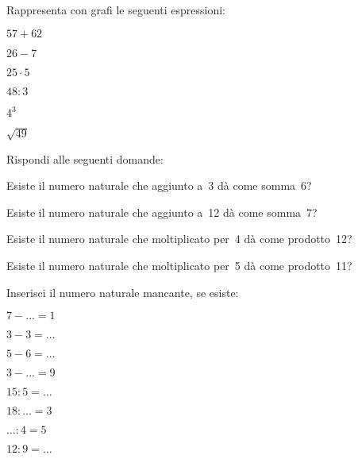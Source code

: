 \begin{esercizio}
Rappresenta con grafi le seguenti espressioni:
\begin{htmulticols}{3}
 \begin{enumeratees}
 \item \(57 + 62\) \qquad
 \item \(26 - 7\) \qquad
 \item \(25 \cdot 5\) \qquad
 \item \(48 : 3\) \qquad
 \item \(4^3\) \qquad
 \item \(\sqrt{49}\) \qquad
 \end{enumeratees}
\end{htmulticols}
\end{esercizio}

\begin{esercizio}
Rispondi alle seguenti domande:
 \begin{enumeratees}
 \item Esiste il numero naturale che aggiunto a~3 dà come somma~6?
 \item Esiste il numero naturale che aggiunto a~12 dà come somma~7?
 \item Esiste il numero naturale che moltiplicato per~4 dà come prodotto~12?
 \item Esiste il numero naturale che moltiplicato per~5 dà come prodotto~11?
 \end{enumeratees}
\end{esercizio}

\begin{esercizio}
 Inserisci il numero naturale mancante, se esiste:
\begin{htmulticols}{4}
\begin{enumeratees}
 \item \(7-\ldots =1\) \qquad
 \item\(3-3=\ldots~\) \qquad
 \item\(5-6=\ldots~\) \qquad
 \item \(3-\ldots =9\) \qquad
 \item\(15:5=\ldots~\) \qquad
 \item\(18:\ldots =3\) \qquad
 \item \(\ldots:4=5\) \qquad
 \item\(12:9=\ldots~\) 
\end{enumeratees}
\end{htmulticols}
\end{esercizio}

